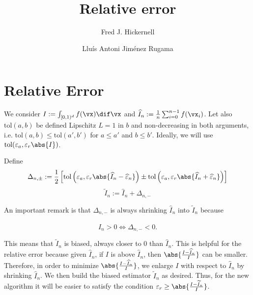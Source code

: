 \documentclass[]{elsarticle}
\theoremstyle{definition}
\newcommand{\cube}{[0,1)^d}
\newcommand{\tol}{\text{tol}}
\begin{document}
\begin{frontmatter}

\title{Relative error}
\author{Fred J. Hickernell}
\address{Room E1-208, Department of Applied Mathematics, Illinois Institute of Technology,\\ 10 W.\ 32$^{\text{nd}}$ St., Chicago, IL 60616}
\author{Llu\'{i}s Antoni Jim\'{e}nez Rugama}
\address{Room E1-120, Department of Applied Mathematics, Illinois Institute of Technology,\\ 10 W.\ 32$^{\text{nd}}$ St., Chicago, IL 60616}
\begin{abstract}
\end{abstract}

\end{frontmatter}

\section{Relative Error}
We consider $I:=\int_{\cube}f(\vx)\dif \vx$ and $\widehat{I}_n:=\frac 1 n \sum_{i=0}^{n-1}f(\vx_i)$. Let also $\tol(a,b)$ be defined Lipschitz $L=1$ in $b$ and non-decreasing in both arguments, i.e. $\tol(a,b)\leq \tol(a',b')$ for $a\leq a'$ and $b\leq b'$. Ideally, we will use $\tol(\varepsilon_a,\varepsilon_r\abs{I})$.

Define
\[
\Delta_{n,\pm}:=\frac 1 2 \left[ \tol\left(\varepsilon_a,\varepsilon_r\abs{\widehat{I}_n-\widehat{\varepsilon}_n}\right) \pm \tol\left(\varepsilon_a,\varepsilon_r\abs{\widehat{I}_n+\widehat{\varepsilon}_n}\right) \right]
\]
\[
\widetilde{I}_n:=\widehat{I}_n+\Delta_{n,-}
\]

An important remark is that $\Delta_{n,-}$ is always shrinking $\widehat{I}_n$ into $\widetilde{I}_n$ because

\[ \widehat{I}_n>0\Longleftrightarrow\Delta_{n,-}<0.\]

This means that $\widetilde{I}_n$ is biased, always closer to 0 than $\widehat{I}_n$. This is helpful for the relative error because given $\widehat{I}_n$, if $I$ is above $\widehat{I}_n$, then $\abs{\frac{I-\widehat{I}_n}{I}}$ can be smaller. Therefore, in order to minimize $\abs{\frac{I-\widehat{I}_n}{I}}$, we enlarge $I$ with respect to $\widehat{I}_n$ by shrinking $\widehat{I}_n$. We then build the biased estimator $\widetilde{I}_n$ as desired. Thus, for the new algorithm it will be easier to satisfy the condition $\varepsilon_r\geq\abs{\frac{I-\widetilde{I}_n}{I}}$. 
\end{document}
